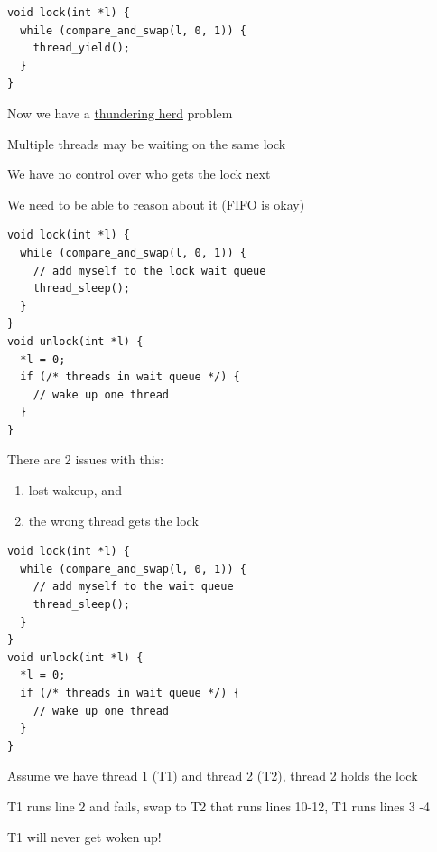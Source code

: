  \begin{slide}


    \begin{verbatim}
void lock(int *l) {
  while (compare_and_swap(l, 0, 1)) {
    thread_yield();
  }
}
    \end{verbatim}

    Now we have a 
    \href{https://en.wikipedia.org/wiki/Thundering_herd_problem}{thundering herd}
    problem

    \leftspace{}Multiple threads may be waiting on the same lock
    \medskip

    We have no control over who gets the lock next

    \leftspace{}We need to be able to reason about it (FIFO is okay)

  \end{slide}

  \begin{slide}


    \begin{verbatim}
void lock(int *l) {
  while (compare_and_swap(l, 0, 1)) {
    // add myself to the lock wait queue
    thread_sleep();
  }
}
void unlock(int *l) {
  *l = 0;
  if (/* threads in wait queue */) {
    // wake up one thread
  }
}
    \end{verbatim}
    \medskip

    There are 2 issues with this:
    
    \begin{enumerate}
      \item lost wakeup, and
      \item the wrong thread gets the lock
    \end{enumerate}
  \end{slide}

  \begin{slide}


    \begin{verbatim}
void lock(int *l) {
  while (compare_and_swap(l, 0, 1)) {
    // add myself to the wait queue
    thread_sleep();
  }
}
void unlock(int *l) {
  *l = 0;
  if (/* threads in wait queue */) {
    // wake up one thread
  }
}
    \end{verbatim}
    \medskip

    Assume we have thread 1 (T1) and thread 2 (T2), thread 2 holds the lock

    \leftspace{}T1 runs line 2 and fails, swap to T2 that runs lines 10-12, T1
    runs lines 3 -4

    \leftspace{}\leftspace{}T1 will never get woken up!
  \end{slide}

